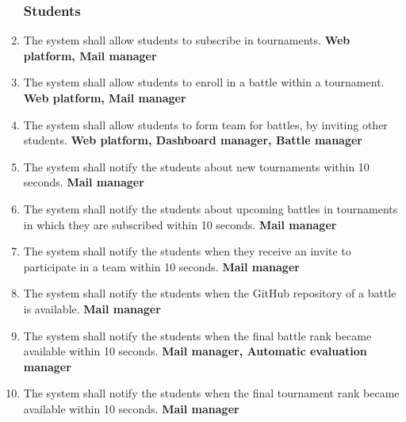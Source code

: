 \begin{enumerate}[label=\textbf{R.\arabic*}]
    \subsubsection*{Students}
    \item {} {The system shall allow students to subscribe in tournaments.} \newline
    \textbf{Web platform, Mail manager}
    \item {} {The system shall allow students to enroll in a battle within a tournament.} \newline
    \textbf{Web platform, Mail manager}
    \item {} {The system shall allow students to form team for battles, by inviting other students.} \newline
    \textbf{Web platform, Dashboard manager, Battle manager}
    \item {} {The system shall notify the students about new tournaments within 10 seconds.} \newline
    \textbf{Mail manager}
    \item {} {The system shall notify the students about upcoming battles in tournaments in which they are subscribed within 10 seconds.} \newline
    \textbf{Mail manager}
     \item {} {The system shall notify the students when they receive an invite to participate in a team within 10 seconds.} \newline
     \textbf{Mail manager}
     \item {} {The system shall notify the students when the GitHub repository of a battle is available.} \newline
     \textbf{Mail manager}
     \item {} {The system shall notify the students when the final battle rank became available within 10 seconds.} \newline
     \textbf{Mail manager, Automatic evaluation manager}
     \item {} {The system shall notify the students when the final tournament rank became available within 10 seconds.} \newline
     \textbf{Mail manager}
\end{enumerate}
